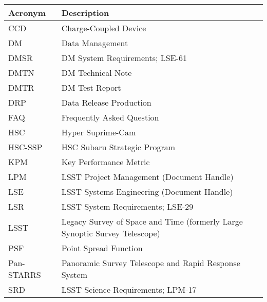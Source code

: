 \addtocounter{table}{-1}
\begin{longtable}{p{}p{}}\hline
\textbf{Acronym} & \textbf{Description}  \\\hline

CCD & Charge-Coupled Device \\\hline
DM & Data Management \\\hline
DMSR & DM System Requirements; LSE-61 \\\hline
DMTN & DM Technical Note \\\hline
DMTR & DM Test Report \\\hline
DRP & Data Release Production \\\hline
FAQ & Frequently Asked Question \\\hline
HSC & Hyper Suprime-Cam \\\hline
HSC-SSP & HSC Subaru Strategic Program \\\hline
KPM & Key Performance Metric \\\hline
LPM & LSST Project Management (Document Handle) \\\hline
LSE & LSST Systems Engineering (Document Handle) \\\hline
LSR & LSST System Requirements; LSE-29 \\\hline
LSST & Legacy Survey of Space and Time (formerly Large Synoptic Survey Telescope) \\\hline
PSF & Point Spread Function \\\hline
Pan-STARRS & Panoramic Survey Telescope and Rapid Response System \\\hline
SRD & LSST Science Requirements; LPM-17 \\\hline
\end{longtable}
